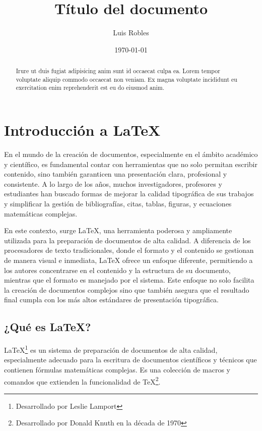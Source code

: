 \documentclass{article}
\title{Título del documento}
\author{Luis Robles}
\date{\today}
\numberwithin{equation}{section}
\begin{document}
\maketitle

\begin{abstract}
Irure ut duis fugiat adipisicing anim sunt id occaecat culpa ea. Lorem tempor voluptate aliquip commodo occaecat non veniam. Ex magna voluptate incididunt eu exercitation enim reprehenderit est eu do eiusmod anim.
\end{abstract}

\section{Introducción a LaTeX}
En el mundo de la creación de documentos, especialmente en el ámbito académico y científico, es fundamental contar con herramientas que no solo permitan escribir contenido, sino también garanticen una presentación clara, profesional y consistente. A lo largo de los años, muchos investigadores, profesores y estudiantes han buscado formas de mejorar la calidad tipográfica de sus trabajos y simplificar la gestión de bibliografías, citas, tablas, figuras, y ecuaciones matemáticas complejas.

En este contexto, surge \LaTeX{}, una herramienta poderosa y ampliamente utilizada para la preparación de documentos de alta calidad. A diferencia de los procesadores de texto tradicionales, donde el formato y el contenido se gestionan de manera visual e inmediata, \LaTeX{} ofrece un enfoque diferente, permitiendo a los autores concentrarse en el contenido y la estructura de su documento, mientras que el formato es manejado por el sistema. Este enfoque no solo facilita la creación de documentos complejos sino que también asegura que el resultado final cumpla con los más altos estándares de presentación tipográfica.

\subsection{¿Qué es LaTeX?}
\LaTeX{}\footnote{Desarrollado por Leslie Lamport} es un sistema de preparación de documentos de alta calidad, especialmente adecuado para la escritura de documentos científicos y técnicos que contienen fórmulas matemáticas complejas. Es una colección de macros y comandos que extienden la funcionalidad de \TeX\footnote{Desarrollado por Donald Knuth en la década de 1970}.
\end{document}
